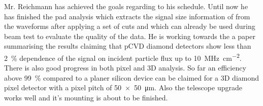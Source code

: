 Mr. Reichmann has achieved the goals regarding to his schedule. Until now he has finished the pad analysis which extracts the signal size information of from the waveforms after applying a set of cuts and which can already be used during beam test to evaluate the quality of the data. He is working towards the a paper summarising the results claiming that \ac{pCVD} diamond detectors show less than \SI{2}{\%} dependence of the signal on incident particle flux up to \SI{10}{\mega\hertz\per\centi\meter^2}. There is also good progress in both pixel and 3D analysis. So far an efficiency above \SI{99}{\%} compared to a planer silicon device can be claimed for a 3D diamond pixel detector with a pixel pitch of \SI{50x50}{\micro\meter}. Also the telescope upgrade works well and it's mounting is about to be finished. 
\parend